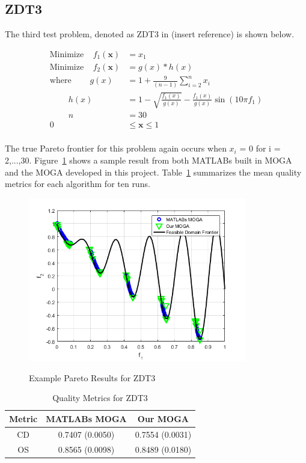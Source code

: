 \documentclass{article}
\begin{document}
\subsection{ZDT3} 
The third test problem, denoted as ZDT3 in (insert reference) is shown below. 


\begin{align*}
\textrm{Minimize} ~~~~~ f_1(\textbf{x}) &= x_1 \\
\textrm{Minimize} ~~~~~ f_2(\textbf{x}) &= g(x)*h(x) \\
\textrm{where} ~~~~~~~~~~ g(x) &= 1+\frac{9}{(n-1)}\sum_{i=2}^{n}x_i \\
~~~~~~~~~~ h(x) &= 1- \sqrt{\frac{f_1(x)}{g(x)}}- \frac{f_1(x)}{g(x)}\sin(10\pi f_1) \\
~~~~~~~~~~ n &= 30 \\
0 &\leq  \textbf{x}  \leq 1 \\
\end{align*}

The true Pareto frontier for this problem again occurs when $x_i$ = 0 for i = 2,...,30. Figure~\ref{fig:ZDT3} shows a sample result from both MATLABs built in MOGA and the MOGA developed in this project. Table~\ref{tab:ZDT3} summarizes the mean quality metrics for each algorithm for ten runs.

\begin{figure}[h]
  \caption{Example Pareto Results for ZDT3}
  \centering
  \includegraphics[width=0.85\textwidth]{ZDT3_pareto_final.png}  
  \label{fig:ZDT3}
\end{figure}

\begin{table}[h]
\caption{Quality Metrics for ZDT3} 
\centering 
\begin{tabular}{|c|c|c|} 
\hline\hline  
Metric & MATLABs MOGA & Our MOGA \\ \hline
CD & 0.7407 (0.0050) & 0.7554 (0.0031) \\ \hline
OS & 0.8565 (0.0098) & 0.8489 (0.0180) \\ \hline
\end{tabular}
\label{tab:ZDT3} 
\end{table}
\end{document}
